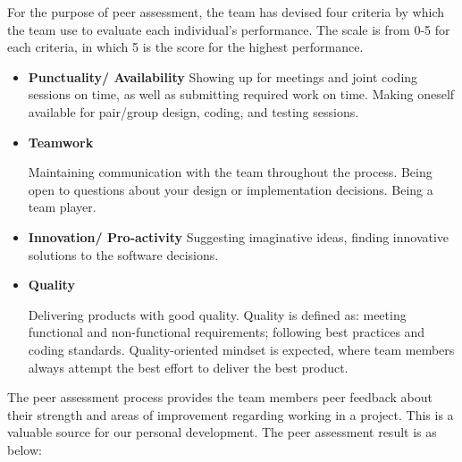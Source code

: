 \documentclass[11pt]{article}
\begin{document}
\begin{enumerate}

For the purpose of peer assessment, the team has devised four criteria by which the team use to evaluate each individual's performance. The scale is from 0-5 for each criteria, in which 5 is the score for the highest performance.
 

\begin{itemize}
\item  \textbf{Punctuality/ Availability}
	\subitem Showing up for meetings and joint coding sessions on time, as well as submitting required work on time.
	Making oneself available for pair/group design, coding, and testing sessions.
	
	\item \textbf{Teamwork}
	
	\subitem Maintaining communication with the team throughout the process. Being open to questions about your design or implementation decisions.  Being a team player.
	
	\item \textbf{Innovation/ Pro-activity}
	\subitem Suggesting imaginative ideas, finding innovative solutions to the software decisions.
	
	\item \textbf{Quality}
	
	\subitem Delivering products with good quality. Quality is defined as: meeting functional and non-functional requirements; following best practices and coding standards. 
	Quality-oriented mindset is expected, where team members always attempt the best effort to deliver the best product. 
	

\end{itemize}
The peer assessment process provides the team members  peer feedback about their strength and areas of improvement regarding working in a project. This is a valuable source for our personal development. The peer assessment result is as below:


\end{enumerate}
\end{document}
